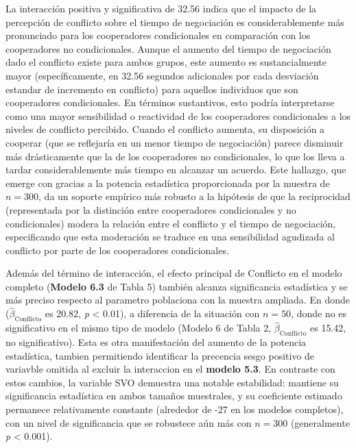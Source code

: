 \documentclass[
  spanish,
  10pt,
]{article}
\begin{document}
La interacción positiva y significativa de 32.56 indica que el impacto
de la percepción de conflicto sobre el tiempo de negociación es
considerablemente más pronunciado para los cooperadores condicionales en
comparación con los cooperadores no condicionales. Aunque el aumento del
tiempo de negociación dado el conflicto existe para ambos grupos, este
aumento es sustancialmente mayor (específicamente, en 32.56 segundos
adicionales por cada desviación estandar de incremento en conflicto)
para aquellos individuos que son cooperadores condicionales. En términos
sustantivos, esto podría interpretarse como una mayor sensibilidad o
reactividad de los cooperadores condicionales a los niveles de conflicto
percibido. Cuando el conflicto aumenta, su disposición a cooperar (que
se reflejaría en un menor tiempo de negociación) parece disminuir más
drásticamente que la de los cooperadores no condicionales, lo que los
lleva a tardar considerablemente más tiempo en alcanzar un acuerdo. Este
hallazgo, que emerge con gracias a la potencia estadística proporcionada
por la muestra de \(n=300\), da un soporte empírico más robusto a la
hipótesis de que la reciprocidad (representada por la distinción entre
cooperadores condicionales y no condicionales) modera la relación entre
el conflicto y el tiempo de negociación, especificando que esta
moderación se traduce en una sensibilidad agudizada al conflicto por
parte de los cooperadores condicionales.

Además del término de interacción, el efecto principal de Conflicto en
el modelo completo (\textbf{Modelo 6.3} de Tabla 5) también alcanza
significancia estadística y se más preciso respecto al parametro
poblaciona con la muestra ampliada. En donde
(\(\hat{\beta}_{\text{Conflicto}}\) es 20.82, \emph{p} \textless{}
0.01), a diferencia de la situación con \(n=50\), donde no es
significativo en el mismo tipo de modelo (Modelo 6 de Tabla 2,
\(\hat{\beta}_{\text{Conflicto}}\) es 15.42, no significativo). Esta es
otra manifestación del aumento de la potencia estadística, tambien
permitiendo identificar la precencia sesgo positivo de variavble omitida
al excluir la interaccion en el \textbf{modelo 5.3}. En contraste con
estos cambios, la variable SVO demuestra una notable estabilidad:
mantiene su significancia estadística en ambos tamaños muestrales, y su
coeficiente estimado permanece relativamente constante (alrededor de -27
en los modelos completos), con un nivel de significancia que se
robustece aún más con \(n=300\) (generalmente \emph{p} \textless{}
0.001).
\end{document}
